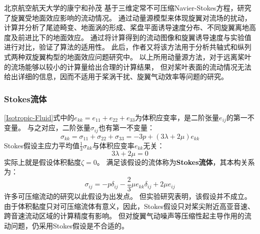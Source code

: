 \documentclass[doctor,openright,twoside,color]{buaathesis}
\begin{document}
北京航空航天大学的康宁和孙茂
基于三维定常不可压缩Navier-Stokes方程，研究了旋翼受地面效应影响的流动情况。
通过动量源模型来体现旋翼对流场的扰动，计算并分析了尾迹畸变、地面涡的形成、桨盘平面诱导速度分布、不同旋翼离地高度及前进比下的地面效应。
通过将计算得到的流动图像和旋翼诱导速度与实验值进行对比，验证了算法的适用性。
此后，作者又将该方法用于分析共轴式和纵列式两种双旋翼构型的地面效应问题研究中。
以上所用动量源方法，对于远离桨叶的流场能够以较小的计算量给出合理的计算结果，
但对桨叶表面的流动情况无法给出详细的信息，因而不适用于桨涡干扰、旋翼气动效率等问题的研究。

\subsubsection{Stokes流体}
\ref{Isotropic-Fluid}式中的$e_{kk}=e_{11}+e_{22}+e_{33}$为体积应变率，是二阶张量$e_{ij}$的第一不变量。
与之对应，二阶张量$\sigma_{ij}$也有第一不变量：
\begin{equation}\label{}
\sigma_{kk}
=
\sigma_{11}+\sigma_{22}+\sigma_{33}
=
-3p
+\left( 3\lambda + 2\mu \right) e_{kk}
\end{equation}
Stokes假设主应力平均值$\frac{1}{3}\sigma_{kk}$与体积应变率$e_{kk}$无关：
\begin{equation}\label{}
3\lambda + 2\mu = 0
\end{equation}
实际上就是假设体积黏度$\zeta = 0$。
满足该假设的流体称为\textbf{Stokes流体}，其本构关系为：
\begin{equation}\label{Stokes-Fluid}
\sigma_{ij}
=
-p\delta_{ij}
-\frac{2}{3}\mu  e_{kk} \delta_{ij}
+2\mu  e_{ij}
\end{equation}
许多可压缩流动的研究以此假设为出发点。
但实验研究表明，该假设并不成立。
由于体积黏度只对可压缩流体有意义，因此，Stokes假设只对桨尖附近高亚音速、跨音速流动区域的计算精度有影响。
但对旋翼气动噪声等压缩性起主导作用的流动问题，仍采用Stokes假设是不合适的。
\end{document}
